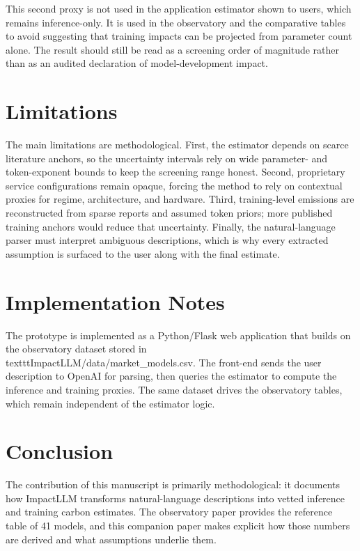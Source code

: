 \documentclass[10pt,a4paper]{article}
\begin{document}
This second proxy is not used in the application estimator shown to users, which remains inference-only. It is used in the observatory and the comparative tables to avoid suggesting that training impacts can be projected from parameter count alone. The result should still be read as a screening order of magnitude rather than as an audited declaration of model-development impact.

\section{Limitations}
The main limitations are methodological. First, the estimator depends on scarce literature anchors, so the uncertainty intervals rely on wide parameter- and token-exponent bounds to keep the screening range honest. Second, proprietary service configurations remain opaque, forcing the method to rely on contextual proxies for regime, architecture, and hardware. Third, training-level emissions are reconstructed from sparse reports and assumed token priors; more published training anchors would reduce that uncertainty. Finally, the natural-language parser must interpret ambiguous descriptions, which is why every extracted assumption is surfaced to the user along with the final estimate.

\section{Implementation Notes}
The prototype is implemented as a Python/Flask web application that builds on the observatory dataset stored in \\texttt{ImpactLLM/data/market_models.csv}. The front-end sends the user description to OpenAI for parsing, then queries the estimator to compute the inference and training proxies. The same dataset drives the observatory tables, which remain independent of the estimator logic.

\section{Conclusion}
The contribution of this manuscript is primarily methodological: it documents how ImpactLLM transforms natural-language descriptions into vetted inference and training carbon estimates. The observatory paper provides the reference table of 41 models, and this companion paper makes explicit how those numbers are derived and what assumptions underlie them.



\end{document}

